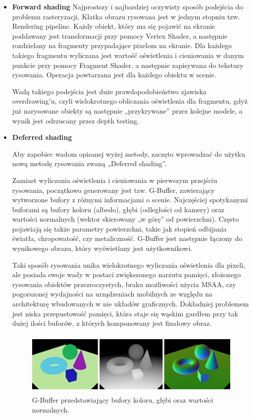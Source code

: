 \begin{itemize}
	\item \textbf{Forward shading}
	Najprostszy i najbardziej oczywisty sposób podejścia do problemu rasteryzacji. Klatka obrazu rysowana jest w jednym stopniu tzw. Rendering pipeline. Każdy obiekt, który ma się pojawić na ekranie poddawany jest transformacji przy pomocy Vertex Shader, a następnie rozdzielany na fragmenty przypadające pixelom na ekranie. Dla każdego takiego fragmentu wyliczana jest wartość oświetlenia i cieniowania w danym punkcie przy pomocy Fragment Shader, a następnie zapisywana do tekstury rysowania. Operacja powtarzana jest dla każdego obiektu w scenie.
	
	Wadą takiego podejścia jest duże prawdopodobieństwo zjawiska overdrawing'u, czyli wielokrotnego obliczania oświetlenia dla fragmentu, gdyż już narysowane obiekty są następnie „przykrywane'' przez kolejne modele, a wynik jest odrzucany przez depth testing.
	
	\item \textbf{Deferred shading}
	
	Aby zapobiec wadom opisanej wyżej metody, zaczęto wprowadzać do użytku nową metodę rysowania zwaną „Deferred shading''.
	
	Zamiast wyliczania oświetlenia i cieniowania w pierwszym przejściu rysowania, początkowo generowany jest tzw. G-Buffer, zawierający wytworzone bufory z różnymi informacjami o scenie. Najczęściej spotykanymi buforami są bufory koloru (albedo), głębi (odległości od kamery) oraz wartości normalnych (wektor skierowany „w górę'' od powierzchni). Często pojawiają się także parametry powierzchni, takie jak stopień odbijania światła, chropowatość, czy metaliczność. G-Buffer jest następnie łączony do wynikowego obrazu, który wyświetlany jest użytkownikowi.
	
	Taki sposób rysowania unika wielokrotnego wyliczania oświetlenia dla pixeli, ale posiada swoje wady w postaci zwiększonego narzutu pamięci, złożonego rysowania obiektów przezroczystych, braku możliwości użycia MSAA, czy pogorszonej wydajności na urządzeniach mobilnych ze względu na architekturę wbudowanych w nie układów graficznych. Dokładniej problemem jest niska przepustowość pamięci, która staje się wąskim gardłem przy tak dużej ilości buforów, z których komponowany jest finałowy obraz.
	
	\begin{figure}[htbp]
		\centering
		\includegraphics[width=4.85833in,height=1.21782in]{images/1_g_buffer.png}
		\caption{G-Buffer przedstawiający bufory koloru, głębi oraz wartości normalnych. \cite{tutsplus-deferred-2024}}
	\end{figure}
	

\end{itemize}
